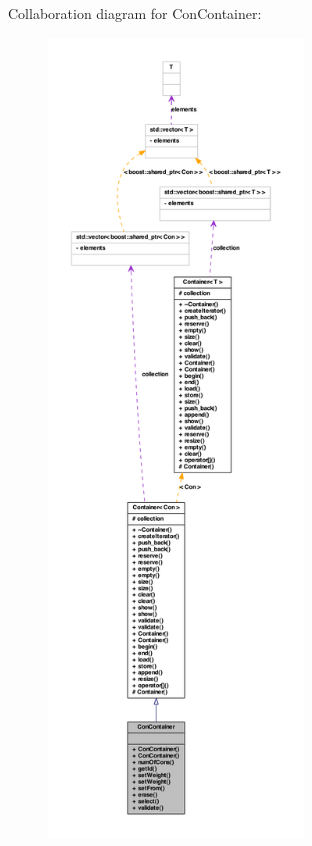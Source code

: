 Collaboration diagram for ConContainer:\nopagebreak
\begin{figure}[H]
\begin{center}
\leavevmode
\includegraphics[height=600pt]{class_con_container__coll__graph}
\end{center}
\end{figure}
